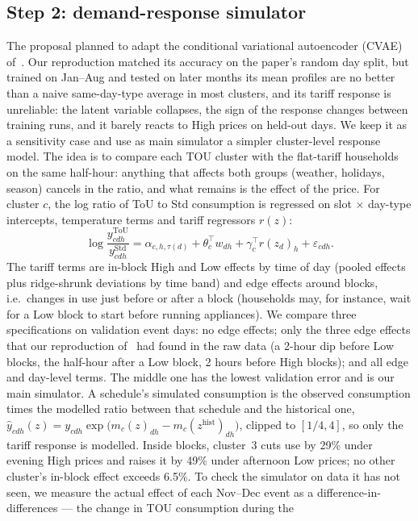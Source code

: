 \documentclass[11pt]{article}
\begin{document}
\subsection{Step 2: demand-response simulator}\label{sec:sim}
The proposal planned to adapt the conditional variational autoencoder (CVAE) of~\cite{bregere2020}. Our reproduction
matched its accuracy on the paper's random day split, but trained on Jan--Aug and tested on later months its mean
profiles are no better than a naive same-day-type average in most clusters, and its tariff response is unreliable: the
latent variable collapses, the sign of the
response changes between training runs, and it barely reacts to High prices on held-out days. We keep it as a
sensitivity case and use as main simulator a simpler cluster-level response model. The idea is to compare each TOU
cluster with the flat-tariff households on the same half-hour: anything that affects both groups (weather, holidays,
season) cancels in the ratio, and what remains is the effect of the price. For cluster $c$, the log ratio of ToU to
Std consumption is regressed on slot $\times$ day-type intercepts, temperature terms and tariff regressors $r(z)$:
\[
\log \frac{y^{\text{ToU}}_{cdh}}{y^{\text{Std}}_{cdh}} = \alpha_{c,h,\tau(d)} + \theta_c^\top w_{dh}
 + \gamma_c^\top r(z_d)_h + \varepsilon_{cdh}.
\]
The tariff terms are in-block High and Low effects by time of day (pooled effects plus ridge-shrunk deviations by
time band) and edge effects around blocks, i.e.\ changes in use just before or after a block (households may, for
instance, wait for a Low block to start before running appliances). We compare three specifications on validation
event days: no edge effects; only the three edge effects that our reproduction of~\cite{bregere2020} had found in the
raw data (a 2-hour dip before Low blocks, the half-hour after a Low block, 2 hours before High blocks); and all edge
and day-level terms. The middle one has the lowest validation error and is our main simulator. A schedule's simulated
consumption is the observed consumption times the modelled ratio between that schedule and the historical one,
$\hat y_{cdh}(z) = y_{cdh}\exp\!\big(m_c(z)_{dh} - m_c(z^{\text{hist}})_{dh}\big)$, clipped to $[1/4,4]$, so only the
tariff response is modelled. Inside blocks, cluster~3 cuts use by 29\% under evening High prices and raises it by 49\%
under afternoon Low prices; no other cluster's in-block effect exceeds 6.5\%. To check the simulator on data it has not seen, we measure
the actual effect of each Nov--Dec event as a difference-in-differences --- the change in TOU consumption during the
\end{document}
